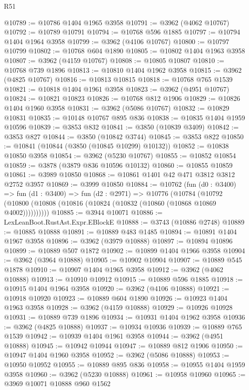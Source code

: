 \begin{lexlean}{R51}
\begin{coremodule}
@10789 := @10786 @1404 @1965 @3958
@10791 := @3962 (@4062 @10767)
@10792 := @10789 @10791
@10794 := @10768 @596 @1885
@10797 := @10794 @1404 @1964 @3958
@10799 := @3962 (@4106 @10767)
@10800 := @10797 @10799
@10802 := @10768 @604 @1890
@10805 := @10802 @1404 @1963 @3958
@10807 := @3962 (@4159 @10767)
@10808 := @10805 @10807
@10810 := @10768 @739 @1896
@10813 := @10810 @1404 @1962 @3958
@10815 := @3962 (@4825 @10767)
@10816 := @10813 @10815
@10818 := @10768 @765 @1539
@10821 := @10818 @1404 @1961 @3958
@10823 := @3962 (@4951 @10767)
@10824 := @10821 @10823
@10826 := @10768 @812 @1906
@10829 := @10826 @1404 @1960 @3958
@10831 := @3962 (@5086 @10767)
@10832 := @10829 @10831
@10835 := @10148 @10767 @895 @836
@10838 := @10835 @1404 @1959 @10596
@10839 := @3853 @832
@10841 := @3850 (@10839 @3409)
@10842 := @3853 @827
@10844 := @3850 (@10842 @3744)
@10845 := @3853 @822
@10850 := @10841 (@10844 (@3850 (@10845 @10299) @10132))
@10852 := @10838 @10850 @3958
@10854 := @3962 (@5230 @10767)
@10855 := @10852 @10854
@10859 := @3878 (@3879 @836 @10596 @10132)
@10860 := @10855 @10859
@10861 := @3989 @10850
@10868 := @10861 @1401 @42 @471 @3812 @3812 @2752 @3957
@10869 := @3999 @10850
@10884 := @10762
    (fun (d0 : @3400) =>
    fun (d1 : @3400) =>
    fun (d2 : @2971) =>
    @10776
      (@10784 (@10792 (@10800 (@10808 (@10816 (@10824 (@10832 (@10860 (@10868 @10869 @4002))))))))))
@10885 := @3944 @10071
@10886 := LexLeanBoot.RustAst.Expr.EBlockE
@10888 := @3743 (@10886 @2748)
@10889 := @10885 @10888
@10891 := @10889 @483 @1485
@10894 := @10891 @1404 @1967 @3958
@10896 := @3962 (@3979 @10888)
@10897 := @10894 @10896
@10899 := @10889 @507 @1872
@10902 := @10899 @1404 @1966 @3958
@10904 := @3962 (@3964 @10888)
@10905 := @10902 @10904
@10907 := @10889 @545 @1878
@10910 := @10907 @1404 @1965 @3958
@10912 := @3962 (@4062 @10888)
@10913 := @10910 @10912
@10915 := @10889 @596 @1885
@10918 := @10915 @1404 @1964 @3958
@10920 := @3962 (@4106 @10888)
@10921 := @10918 @10920
@10923 := @10889 @604 @1890
@10926 := @10923 @1404 @1963 @3958
@10928 := @3962 (@4159 @10888)
@10929 := @10926 @10928
@10931 := @10889 @739 @1896
@10934 := @10931 @1404 @1962 @3958
@10936 := @3962 (@4825 @10888)
@10937 := @10934 @10936
@10939 := @10889 @765 @1539
@10942 := @10939 @1404 @1961 @3958
@10944 := @3962 (@4951 @10888)
@10945 := @10942 @10944
@10947 := @10889 @812 @1906
@10950 := @10947 @1404 @1960 @3958
@10952 := @3962 (@5086 @10888)
@10953 := @10950 @10952
@10955 := @10889 @895 @836
@10958 := @10955 @1404 @1959 @3958
@10960 := @3962 (@5230 @10888)
@10961 := @10958 @10960
@10965 := @3969 @10071 @10888 @960 @1562

\end{coremodule}
\end{lexlean}
